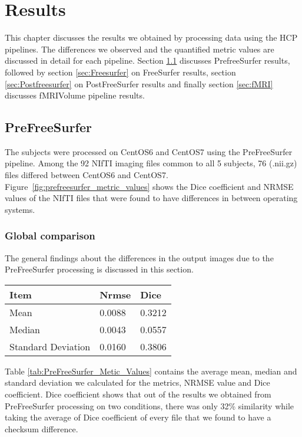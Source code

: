 \chapter{Results}\label{results}
This chapter discusses the results we obtained by processing data using the HCP pipelines. The differences we observed and the quantified metric values are discussed in detail for each pipeline. Section \ref{sec:Prefreesurfer} discusses PrefreeSurfer results, followed by section \ref{sec:Freesurfer} on FreeSurfer results, section \ref{sec:Postfreesurfer} on PostFreeSurfer results and finally section \ref{sec:fMRI} discusses fMRIVolume pipeline results.

\section{PreFreeSurfer} \label{sec:Prefreesurfer}
The subjects were processed on CentOS6 and CentOS7 using the PreFreeSurfer pipeline. Among the 92 NIfTI imaging files common to all 5 subjects, 76 (.nii.gz) files differed between CentOS6 and CentOS7. Figure~\ref{fig:prefreesurfer_metric_values} shows the Dice coefficient and NRMSE values of the NIfTI files that were found to have differences in between operating systems.

\subsection{Global comparison}
The general findings about the differences in the output images due to the PreFreeSurfer processing is discussed in this section.

\begin{center}
\begin{tabular}{|l|l|l|}
\hline
\textbf{Item}      & \textbf{Nrmse} & \textbf{Dice} \\ \hline
Mean               & 0.0088   & 0.3212   \\ \hline
Median             & 0.0043    & 0.0557    \\ \hline
Standard Deviation & 0.0160    & 0.3806   \\ \hline
\end{tabular}
\label{tab:PreFreeSurfer_Metic_Values}
\end{center}

Table \ref{tab:PreFreeSurfer_Metic_Values} contains the average mean, median and standard deviation we calculated for the metrics, NRMSE value and Dice coefficient. Dice coefficient shows that out of the results we obtained from PreFreeSurfer processing on two conditions, there was only 32\% similarity while taking the average of Dice coefficient of every file that we found to have a checksum difference.

